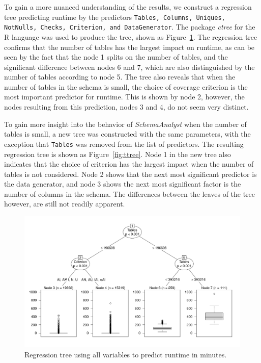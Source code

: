 
To gain a more nuanced understanding of the results, we construct a regression tree predicting runtime by the predictors
\texttt{Tables, Columns, Uniques, NotNulls, Checks, Criterion, and DataGenerator}. The package \textit{ctree} for the R
language was used to produce the tree, shown as Figure~\ref{fig:atree}. The regression tree confirms that the number of
tables has the largest impact on runtime, as can be seen by the fact that the node 1 splits on the number of tables, and
the significant difference between nodes 6 and 7, which are also distinguished by the number of tables according to node
5. The tree also reveals that when the number of tables in the schema is small, the choice of coverage criterion is the
most important predictor for runtime.  This is shown by node 2, however, the nodes resulting from this prediction, nodes
3 and 4, do not seem very distinct.

To gain more insight into the behavior of \textit{SchemaAnalyst} when the number of tables is small, a new tree was
constructed with the same parameters, with the exception that \texttt{Tables} was removed from the list of predictors.
The resulting regression tree is shown as Figure~\ref{fig:ttree}.  Node 1 in the new tree also indicates that the choice
of criterion has the largest impact when the number of tables is not considered.  Node 2 shows that the next most
significant predictor is the data generator, and node 3 shows the next most significant factor is the number of columns
in the schema.  The differences between the leaves of the tree however, are still not readily apparent.


\begin{figure}
\centering
  \centering
  \includegraphics[width=.75\linewidth]{diagrams/AllTree.pdf}
  \caption{Regression tree using all variables to predict runtime in
  minutes. \vspace{-.15in}}
  \label{fig:atree}
  \vspace{-.15in}
\end{figure}

